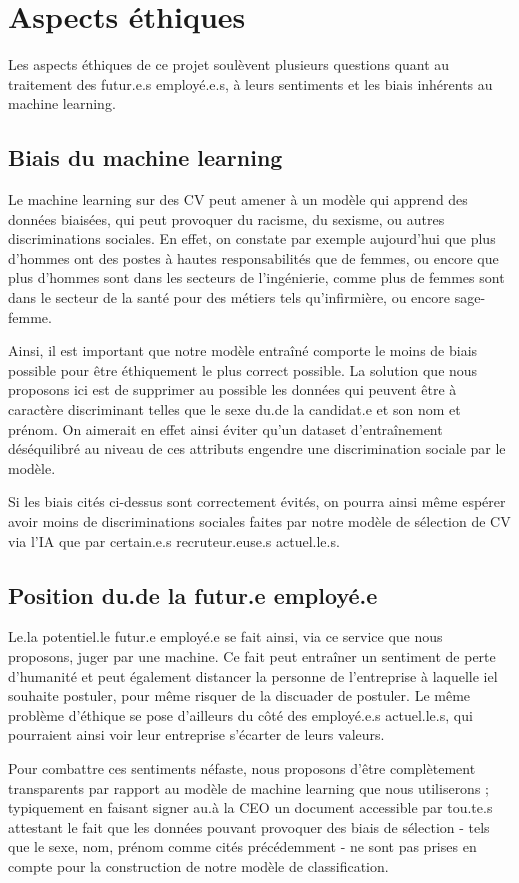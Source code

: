 \section{Aspects éthiques}\label{section:aspects_ethiques}

Les aspects éthiques de ce projet soulèvent plusieurs questions quant au traitement des futur.e.s employé.e.s, à leurs sentiments et les biais inhérents au machine learning.

\subsection{Biais du machine learning}
Le machine learning sur des CV peut amener à un modèle qui apprend des données biaisées, qui peut provoquer du racisme, du sexisme, ou autres discriminations sociales. En effet, on constate par exemple aujourd'hui que plus d'hommes ont des postes à hautes responsabilités que de femmes, ou encore que plus d'hommes sont dans les secteurs de l'ingénierie, comme plus de femmes sont dans le secteur de la santé pour des métiers tels qu'infirmière, ou encore sage-femme. \newline

Ainsi, il est important que notre modèle entraîné comporte le moins de biais possible pour être éthiquement le plus correct possible. La solution que nous proposons ici est de supprimer au possible les données qui peuvent être à caractère discriminant telles que le sexe du.de la candidat.e et son nom et prénom. On aimerait en effet ainsi éviter qu'un dataset d'entraînement déséquilibré au niveau de ces attributs engendre une discrimination sociale par le modèle.\newline

Si les biais cités ci-dessus sont correctement évités, on pourra ainsi même espérer avoir moins de discriminations sociales faites par notre modèle de sélection de CV via l'IA que par certain.e.s recruteur.euse.s actuel.le.s.

\subsection{Position du.de la futur.e employé.e}
Le.la potentiel.le futur.e employé.e se fait ainsi, via ce service que nous proposons, juger par une machine. Ce fait peut entraîner un sentiment de perte d'humanité et peut également distancer la personne de l'entreprise à laquelle iel souhaite postuler, pour même risquer de la discuader de postuler. Le même problème d'éthique se pose d'ailleurs du côté des employé.e.s actuel.le.s, qui pourraient ainsi voir leur entreprise s'écarter de leurs valeurs.\newline

Pour combattre ces sentiments néfaste, nous proposons d'être complètement transparents par rapport au modèle de machine learning que nous utiliserons ; typiquement en faisant signer au.à la CEO un document accessible par tou.te.s attestant le fait que les données pouvant provoquer des biais de sélection - tels que le sexe, nom, prénom comme cités précédemment - ne sont pas prises en compte pour la construction de notre modèle de classification.




